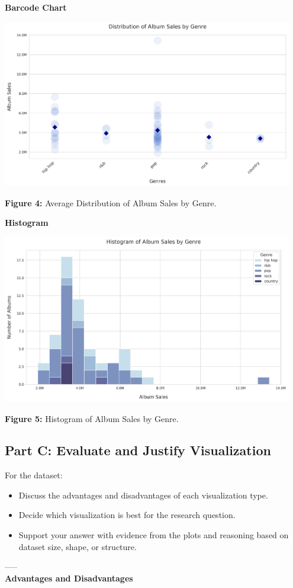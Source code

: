 \textbf{Barcode Chart}
\begin{center}
  \includegraphics[width=0.95\textwidth]{figures/album_sales_by_genre_strip_plot.png}
  
  \textbf{Figure 4:} Average Distribution of Album Sales by Genre.
\end{center}

\textbf{Histogram}
\begin{center}
  \includegraphics[width=0.95\textwidth]{figures/album_sales_by_genre_histogram_plot.png}
  
  \textbf{Figure 5:} Histogram of Album Sales by Genre.
\end{center}

\subsection{Part C: Evaluate and Justify Visualization}
For the dataset:
\begin{itemize}
    \item Discuss the advantages and disadvantages of each visualization type.
    \item Decide which visualization is best for the research question.
    \item Support your answer with evidence from the plots and reasoning based on dataset size, shape, or structure.
\end{itemize}
-----\\
\textbf{Advantages and Disadvantages}\\

